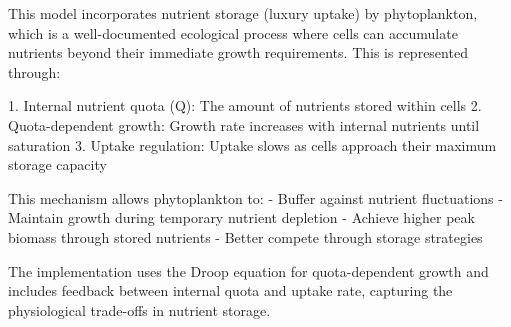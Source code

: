 This model incorporates nutrient storage (luxury uptake) by phytoplankton, which is a well-documented ecological process where cells can accumulate nutrients beyond their immediate growth requirements. This is represented through:

1. Internal nutrient quota (Q): The amount of nutrients stored within cells
2. Quota-dependent growth: Growth rate increases with internal nutrients until saturation
3. Uptake regulation: Uptake slows as cells approach their maximum storage capacity

This mechanism allows phytoplankton to:
- Buffer against nutrient fluctuations
- Maintain growth during temporary nutrient depletion
- Achieve higher peak biomass through stored nutrients
- Better compete through storage strategies

The implementation uses the Droop equation for quota-dependent growth and includes feedback between internal quota and uptake rate, capturing the physiological trade-offs in nutrient storage.
